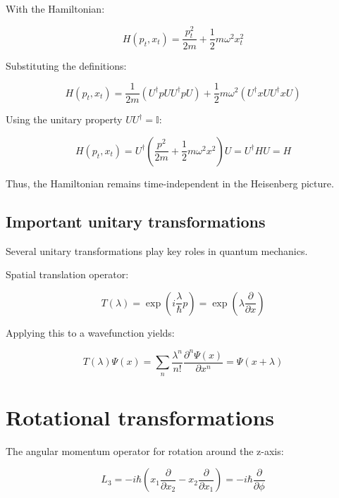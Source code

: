 \documentclass[italian]{HKNdocument}
\begin{document}
With the Hamiltonian:

\begin{equation}
H\left(p_{t}, x_{t}\right)=\frac{p_{t}^{2}}{2 m}+\frac{1}{2} m \omega^{2} x_{t}^{2}
\end{equation}

Substituting the definitions:

\begin{equation}
H\left(p_{t}, x_{t}\right)=\frac{1}{2 m}\left(U^{\dagger} p U U^{\dagger} p U\right) + \frac{1}{2} m \omega^{2}\left(U^{\dagger} x U U^{\dagger} x U\right)
\end{equation}

Using the unitary property $U U^{\dagger}=\mathbb{I}$:

\begin{equation}
H\left(p_{t}, x_{t}\right)=U^{\dagger}\left(\frac{p^{2}}{2 m}+\frac{1}{2} m \omega^{2} x^{2}\right) U=U^{\dagger} H U=H
\end{equation}

Thus, the Hamiltonian remains time-independent in the Heisenberg picture.

\subsection{Important unitary transformations}
Several unitary transformations play key roles in quantum mechanics.

Spatial translation operator:

\begin{equation}
T(\lambda)=\exp \left(i \frac{\lambda}{\hbar} p\right)=\exp \left(\lambda \frac{\partial}{\partial x}\right)
\end{equation}

Applying this to a wavefunction yields:

\begin{equation}
T(\lambda) \Psi(x)=\sum_{n} \frac{\lambda^{n}}{n!} \frac{\partial^{n} \Psi(x)}{\partial x^{n}}=\Psi(x+\lambda)
\end{equation}

\section{Rotational transformations}

The angular momentum operator for rotation around the z-axis:

\begin{equation}
L_{3}=-i \hbar\left(x_{1} \frac{\partial}{\partial x_{2}}-x_{2} \frac{\partial}{\partial x_{1}}\right)=-i \hbar \frac{\partial}{\partial \phi}
\end{equation}
\end{document}
